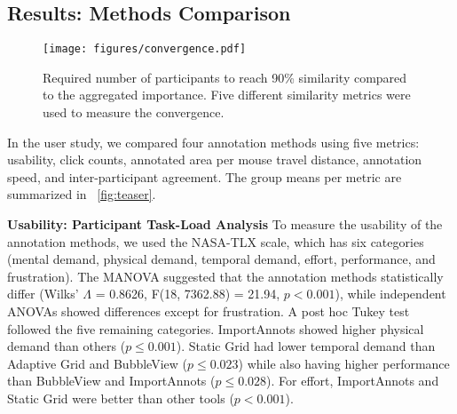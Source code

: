 \subsection{Results: Methods Comparison}

\label{results:comparison}
\begin{figure}[t]
    \centering
    \texttt{[image: figures/convergence.pdf]}
    \caption{Required number of participants to reach 90\% similarity compared to the aggregated importance. Five different similarity metrics were used to measure the convergence.} 
    \label{fig:convergence}
    \vspace{-5mm}
\end{figure}

In the user study, we compared four annotation methods using five metrics: usability, click counts, annotated area per mouse travel distance, annotation speed, and inter-participant agreement. The group means per metric are summarized in ~\autoref{fig:teaser}.

\noindent\textbf{Usability: Participant Task-Load Analysis}
To measure the usability of the annotation methods, we used the NASA-TLX scale, which has six categories (mental demand, physical demand, temporal demand, effort, performance, and frustration).
The MANOVA suggested that the annotation methods statistically differ (Wilks’ $\Lambda$ = 0.8626, F(18, 7362.88) = 21.94, $p < 0.001$), while independent ANOVAs showed differences except for frustration. 
A post hoc Tukey test followed the five remaining categories.
ImportAnnots showed higher physical demand than others ($p\leq0.001$). Static Grid had lower temporal demand than Adaptive Grid and BubbleView ($p\leq0.023$) while also having higher performance than BubbleView and ImportAnnots ($p\leq0.028$). For effort, ImportAnnots and Static Grid were better than other tools ($p<0.001$).




